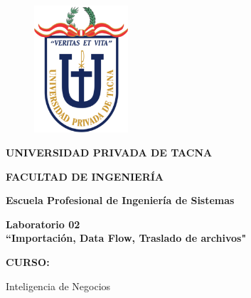 \documentclass[12pt,letterpaper]{article}
\begin{document}
\begin{titlepage}
    \begin{center}
        \begin{figure}[htb]
            \begin{center}
                \includegraphics[width=3.5cm]{./img/logo}
            \end{center}
        \end{figure}
        \vspace*{0.15in}
        \begin{Large}
            \textbf{UNIVERSIDAD PRIVADA DE TACNA}\\
        \end{Large}
        \vspace*{0.15in}
        \begin{Large}
            \textbf{FACULTAD DE INGENIERÍA} \\
        \end{Large}
        \vspace*{0.1in}
        \begin{Large}
            \textbf{Escuela Profesional de Ingeniería de Sistemas} \\
        \end{Large}
        \vspace*{0.3in}
        \begin{Large}
            \textbf{Laboratorio 02}\\
            \textbf{``Importación, Data Flow, Traslado de archivos"}\\
        \end{Large}
        \vspace*{0.2in}
        \begin{Large}
            \textbf{CURSO:} \\
        \end{Large}
        \vspace*{0.1in}
        \begin{large}
            Inteligencia de Negocios\\

\end{large}
\end{center}
\end{titlepage}
\end{document}
